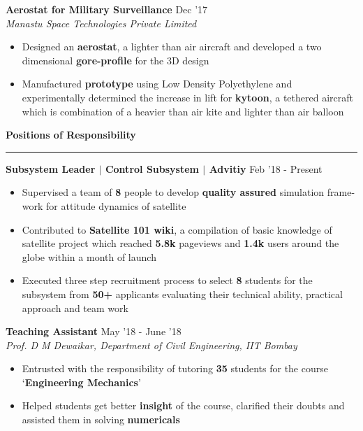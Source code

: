 \documentclass[8pt]{article}%
\begin{document}
{{\flushleft \bf \large{Aerostat for Military Surveillance}}  \hfill {{{Dec '17}}} \\
{\em {Manastu Space Technologies Private Limited} } 
\begin{itemize}
    \item Designed an {\bf aerostat}, a lighter than air aircraft and developed a two dimensional {\bf gore-profile} for the 3D design
    \item Manufactured {\bf prototype} using Low Density Polyethylene and experimentally determined the increase in lift for {\bf kytoon}, a tethered aircraft which is combination of a heavier than air kite and lighter than air balloon
\end{itemize}

\begin{flushleft}
\bf{\Large{Positions of Responsibility}}
\end{flushleft}
\vspace{-2mm}

\hrule

{\flushleft \bf \large{Subsystem Leader $|$ Control Subsystem $|$ Advitiy}} \hfill {{Feb '18 - Present}}\\
\vspace{-4mm}
\begin{itemize}
    
    \item Supervised a team of {\bf 8} people to develop {\bf quality assured} simulation frame-work for attitude dynamics of satellite
    \item Contributed to {\bf Satellite 101 wiki}, a compilation of basic knowledge of satellite project which reached {\bf 5.8k} pageviews and {\bf 1.4k} users around the globe within a month of launch
    \item Executed three step recruitment process to select {\bf 8} students for the subsystem from {\bf 50+} applicants evaluating their technical ability, practical approach and team work
\end{itemize}


{\flushleft \bf \large{Teaching Assistant}} \hfill {{{May '18 - June '18} }} \\ 
{\em Prof. D M Dewaikar, Department of Civil Engineering, IIT Bombay}
\begin{itemize}
    \setlength\itemsep{0.01em}
    \item Entrusted with the responsibility of tutoring {\bf 35} students for the course `{\bf Engineering Mechanics}'
    \item Helped students get better {\bf insight} of the course, clarified their doubts and assisted them in solving {\bf numericals}


\end{itemize}}
\end{document}
